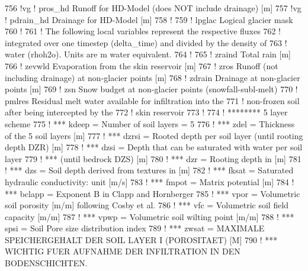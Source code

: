 \begin{DoxyCode}
756 \textcolor{comment}{!vg ! pros\_hd       Runoff for HD-Model (does NOT include drainage) [m]}
757 \textcolor{comment}{!vg ! pdrain\_hd     Drainage for HD-Model [m]}
758 \textcolor{comment}{! }
759 \textcolor{comment}{! lpglac        Logical glacier mask}
760 \textcolor{comment}{!}
761 \textcolor{comment}{! The following local variables represent the respective fluxes}
762 \textcolor{comment}{! integrated over one timestep (delta\_time) and divided by the density of}
763 \textcolor{comment}{! water (rhoh2o). Units are m water equivalent.}
764 \textcolor{comment}{!}
765 \textcolor{comment}{! zraind        Total rain [m]}
766 \textcolor{comment}{! zevwld        Evaporation from the skin reservoir [m]}
767 \textcolor{comment}{! zros          Runoff (not including drainage) at non-glacier points [m]}
768 \textcolor{comment}{! zdrain        Drainage at non-glacier points [m]}
769 \textcolor{comment}{! zsn           Snow budget at non-glacier points (snowfall-subl-melt)}
770 \textcolor{comment}{! pmlres        Residual melt water available for infiltration into the}
771 \textcolor{comment}{!               non-frozen soil after being intercepted by the}
772 \textcolor{comment}{!               skin reservoir}
773 \textcolor{comment}{!}
774 \textcolor{comment}{!  ******** 5 layer scheme}
775 \textcolor{comment}{!     ***  kdeep = Number of soil layers = 5}
776 \textcolor{comment}{!     ***   zdel = Thickness of the 5 soil layers [m]}
777 \textcolor{comment}{!     ***  dzrsi = Rooted depth per soil layer (until rooting depth DZR) [m]}
778 \textcolor{comment}{!     ***   dzsi = Depth that can be saturated with water per soil layer}
779 \textcolor{comment}{!     ***          (until bedrock DZS) [m]}
780 \textcolor{comment}{!     ***    dzr = Rooting depth in [m]}
781 \textcolor{comment}{!     ***    dzs = Soil depth derived from textures in [m]}
782 \textcolor{comment}{!     ***  fksat = Saturated hydraulic conductivity: unit [m/s]}
783 \textcolor{comment}{!     ***  fmpot = Matrix potential [m]}
784 \textcolor{comment}{!     *** bclapp = Exponent B in Clapp and Hornberger}
785 \textcolor{comment}{!     ***   vpor = Volumetric soil porosity [m/m]   following Cosby et al.}
786 \textcolor{comment}{!     ***    vfc = Volumetric soil field capacity [m/m]}
787 \textcolor{comment}{!     ***   vpwp = Volumetric soil wilting point [m/m]}
788 \textcolor{comment}{!     ***   spsi = Soil Pore size distribution index}
789 \textcolor{comment}{!     ***  zwsat = MAXIMALE SPEICHERGEHALT DER SOIL LAYER I (POROSITAET) [M]}
790 \textcolor{comment}{!     ***          WICHTIG FUER AUFNAHME DER INFILTRATION IN DEN BODENSCHICHTEN.}

\end{DoxyCode}
